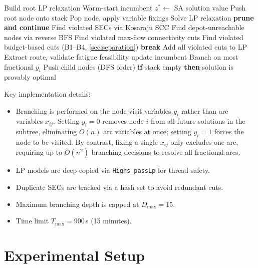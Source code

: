 \documentclass[preprint,11pt]{elsarticle}
\begin{document}
\begin{algorithm}[H]
\caption{Branch-and-Cut for AOPF}
\label{alg:bnc}
\begin{algorithmic}[1]
\State Build root LP relaxation
\State Warm-start incumbent $z^* \gets$ SA solution value
\State Push root node onto stack
  \State Pop node, apply variable fixings
   
    \State Solve LP relaxation
     \textbf{prune and continue} \EndIf
    \State Find violated SECs via Kosaraju SCC
    \State Find depot-unreachable nodes via reverse BFS
    \State Find violated max-flow connectivity cuts
    \State Find violated budget-based cuts (B1--B4, \cref{sec:separation})
     \textbf{break} \EndIf
    \State Add all violated cuts to LP
  \EndFor
    \State Extract route, validate fatigue feasibility
     update incumbent \EndIf
  \Else
    \State Branch on most fractional $y_i$
    \State Push child nodes (DFS order)
  \EndIf
\EndWhile
\State \textbf{if} stack empty \textbf{then} solution is provably optimal
\end{algorithmic}
\end{algorithm}

Key implementation details:
\begin{itemize}[nosep]
  \item Branching is performed on the node-visit variables $y_i$ rather than arc variables $x_{ij}$.
        Setting $y_i = 0$ removes node $i$ from all future solutions in the subtree, eliminating $O(n)$ arc variables at once; setting $y_i = 1$ forces the node to be visited.
        By contrast, fixing a single $x_{ij}$ only excludes one arc, requiring up to $O(n^2)$ branching decisions to resolve all fractional arcs.
  \item LP models are deep-copied via \texttt{Highs\_passLp} for thread safety.
  \item Duplicate SECs are tracked via a hash set to avoid redundant cuts.
  \item Maximum branching depth is capped at $D_{\max} = 15$.
  \item Time limit $T_{\max} = 900$\,s (15 minutes).
\end{itemize}

\section{Experimental Setup}
\label{sec:experiments}
\end{document}
